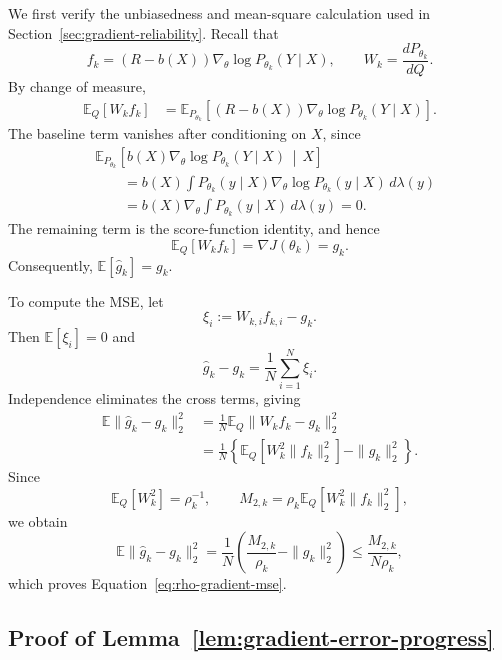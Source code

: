 \documentclass[11pt]{article}
\theoremstyle{remark}
\newcommand{\E}{\mathbb{E}}
\begin{document}
We first verify the unbiasedness and mean-square calculation used in
Section~\ref{sec:gradient-reliability}. Recall that
\[
 f_k
 =
 (R-b(X))
 \nabla_\theta\log P_{\theta_k}(Y\mid X),
 \qquad
 W_k
 =
 \frac{dP_{\theta_k}}{dQ}.
\]
By change of measure,
\begin{align*}
 \E_Q[W_kf_k]
 &=
 \E_{P_{\theta_k}}
 \left[
 (R-b(X))
 \nabla_\theta\log P_{\theta_k}(Y\mid X)
 \right].
\end{align*}
The baseline term vanishes after conditioning on $X$, since
\begin{align*}
 &\E_{P_{\theta_k}}
 \left[
 b(X)\nabla_\theta\log P_{\theta_k}(Y\mid X)
 \,\middle|\,X
 \right]\\
 &\qquad=
 b(X)
 \int
 P_{\theta_k}(y\mid X)
 \nabla_\theta\log P_{\theta_k}(y\mid X)
 \,d\lambda(y)\\
 &\qquad=
 b(X)\nabla_\theta
 \int P_{\theta_k}(y\mid X)\,d\lambda(y)
 =0.
\end{align*}
The remaining term is the score-function identity, and hence
\[
 \E_Q[W_kf_k]
 =
 \nabla J(\theta_k)
 =
 g_k.
\]
Consequently,
$\E[\widehat g_k]=g_k$.

To compute the MSE, let
\[
 \xi_i:=W_{k,i}f_{k,i}-g_k.
\]
Then $\E[\xi_i]=0$ and
\[
 \widehat g_k-g_k
 =
 \frac1N\sum_{i=1}^N\xi_i.
\]
Independence eliminates the cross terms, giving
\begin{align*}
 \E\|\widehat g_k-g_k\|_2^2
 &=
 \frac1N
 \E_Q\|W_kf_k-g_k\|_2^2\\
 &=
 \frac1N
 \left\{
 \E_Q[W_k^2\|f_k\|_2^2]
 -
 \|g_k\|_2^2
 \right\}.
\end{align*}
Since
\[
 \E_Q[W_k^2]
 =
 \rho_k^{-1},
 \qquad
 M_{2,k}
 =
 \rho_k\E_Q[W_k^2\|f_k\|_2^2],
\]
we obtain
\[
 \E\|\widehat g_k-g_k\|_2^2
 =
 \frac1N
 \left(
 \frac{M_{2,k}}{\rho_k}
 -
 \|g_k\|_2^2
 \right)
 \le
 \frac{M_{2,k}}{N\rho_k},
\]
which proves Equation~\eqref{eq:rho-gradient-mse}.


\subsection{Proof of Lemma~\ref{lem:gradient-error-progress}}
\end{document}
